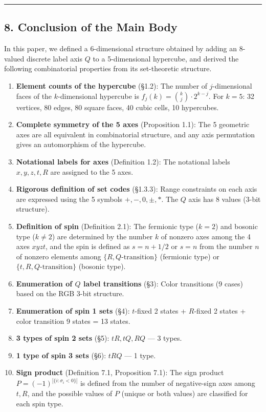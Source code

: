 \documentclass[
  a4paper,11pt]{article}
\providecommand{\tightlist}{%
  \setlength{\itemsep}{0pt}\setlength{\parskip}{0pt}}
\theoremstyle{definition}
\theoremstyle{remark}
\begin{document}
\begin{center}\rule{0.5\linewidth}{0.5pt}\end{center}

\subsection{8. Conclusion of the Main
Body}\label{conclusion-of-the-main-body}

In this paper, we defined a 6-dimensional structure obtained by adding
an 8-valued discrete label axis \(Q\) to a 5-dimensional hypercube, and
derived the following combinatorial properties from its set-theoretic
structure.

\begin{enumerate}
\def\labelenumi{\arabic{enumi}.}
\tightlist
\item
  \textbf{Element counts of the hypercube} (§1.2): The number of
  \(j\)-dimensional faces of the \(k\)-dimensional hypercube is
  \(f_j(k) = \binom{k}{j} \cdot 2^{k-j}\). For \(k = 5\): 32 vertices,
  80 edges, 80 square faces, 40 cubic cells, 10 hypercubes.
\item
  \textbf{Complete symmetry of the 5 axes} (Proposition 1.1): The 5
  geometric axes are all equivalent in combinatorial structure, and any
  axis permutation gives an automorphism of the hypercube.
\item
  \textbf{Notational labels for axes} (Definition 1.2): The notational
  labels \(x, y, z, t, R\) are assigned to the 5 axes.
\item
  \textbf{Rigorous definition of set codes} (§1.3.3): Range constraints
  on each axis are expressed using the 5 symbols \(+, -, 0, \pm, *\).
  The \(Q\) axis has 8 values (3-bit structure).
\item
  \textbf{Definition of spin} (Definition 2.1): The fermionic type
  (\(k = 2\)) and bosonic type (\(k \neq 2\)) are determined by the
  number \(k\) of nonzero axes among the 4 axes \(xyzt\), and the spin
  is defined as \(s = n + 1/2\) or \(s = n\) from the number \(n\) of
  nonzero elements among \(\{R, Q\text{-transition}\}\) (fermionic type)
  or \(\{t, R, Q\text{-transition}\}\) (bosonic type).
\item
  \textbf{Enumeration of \(Q\) label transitions} (§3): Color
  transitions (9 cases) based on the RGB 3-bit structure.
\item
  \textbf{Enumeration of spin 1 sets} (§4): \(t\)-fixed 2 states +
  \(R\)-fixed 2 states + color transition 9 states = 13 states.
\item
  \textbf{3 types of spin 2 sets} (§5): \(tR, tQ, RQ\) --- 3 types.
\item
  \textbf{1 type of spin 3 sets} (§6): \(tRQ\) --- 1 type.
\item
  \textbf{Sign product} (Definition 7.1, Proposition 7.1): The sign
  product \(P = (-1)^{|\{i : \sigma_i < 0\}|}\) is defined from the
  number of negative-sign axes among \(t, R\), and the possible values
  of \(P\) (unique or both values) are classified for each spin type.
\end{enumerate}
\end{document}

